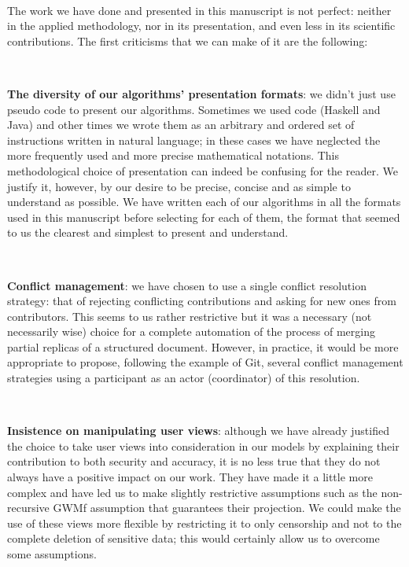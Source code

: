 ~


The work we have done and presented in this manuscript is not perfect: neither in the applied methodology, nor in its presentation, and even less in its scientific contributions. The first criticisms that we can make of it are the following:

~

\noindent\textbf{The diversity of our algorithms' presentation formats}: we didn't just use pseudo code to present our algorithms. Sometimes we used code (Haskell and Java) and other times we wrote them as an arbitrary and ordered set of instructions written in natural language; in these cases we have neglected the more frequently used and more precise mathematical notations. This methodological choice of presentation can indeed be confusing for the reader. We justify it, however, by our desire to be precise, concise and as simple to understand as possible. We have written each of our algorithms in all the formats used in this manuscript before selecting for each of them, the format that seemed to us the clearest and simplest to present and understand.


~

\noindent\textbf{Conflict management}: we have chosen to use a single conflict resolution strategy: that of rejecting conflicting contributions and asking for new ones from contributors. This seems to us rather restrictive but it was a necessary (not necessarily wise) choice for a complete automation of the process of merging partial replicas of a structured document. However, in practice, it would be more appropriate to propose, following the example of Git, several conflict management strategies using a participant as an actor (coordinator) of this resolution.



~

\noindent\textbf{Insistence on manipulating user views}: although we have already justified the choice to take user views into consideration in our models by explaining their contribution to both security and accuracy, it is no less true that they do not always have a positive impact on our work. They have made it a little more complex and have led us to make slightly restrictive assumptions such as the non-recursive GWMf assumption that guarantees their projection. We could make the use of these views more flexible by restricting it to only censorship and not to the complete deletion of sensitive data; this would certainly allow us to overcome some assumptions.




